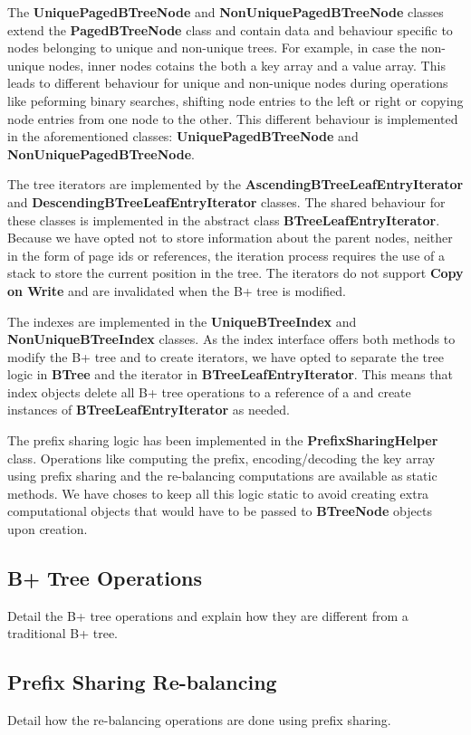\documentclass[11pt,a4paper,oneside]{article}
\begin{document}
The \textbf{UniquePagedBTreeNode} and \textbf{NonUniquePagedBTreeNode} classes extend the \textbf{PagedBTreeNode} class and contain data and behaviour specific to nodes belonging to unique and non-unique trees. For example, in case the non-unique nodes, inner nodes cotains the both a key array and a value array. This leads to different behaviour for unique and non-unique nodes during operations like peforming binary searches, shifting node entries to the left or right or copying node entries from one node to the other. This different behaviour is implemented in the aforementioned classes: \textbf{UniquePagedBTreeNode} and \textbf{NonUniquePagedBTreeNode}. 

The tree iterators are implemented by the \textbf{AscendingBTreeLeafEntryIterator} and \textbf{DescendingBTreeLeafEntryIterator} classes. The shared behaviour for these classes is implemented in the abstract class \textbf{BTreeLeafEntryIterator}. Because we have opted not to store information about the parent nodes, neither in the form of page ids or references, the iteration process requires the use of a stack to store the current position in the tree. The iterators do not support \textbf{Copy on Write} and are invalidated when the B+ tree is modified. 

The indexes are implemented in the \textbf{UniqueBTreeIndex} and \textbf{NonUniqueBTreeIndex} classes. As the index interface offers both methods to modify the B+ tree and to create iterators, we have opted to separate the tree logic in \textbf{BTree} and the iterator in \textbf{BTreeLeafEntryIterator}. This means that index objects delete all B+ tree operations to a reference of a  and create instances of \textbf{BTreeLeafEntryIterator} as needed.

The prefix sharing logic has been implemented in the \textbf{PrefixSharingHelper} class. Operations like computing the prefix, encoding/decoding the key array using prefix sharing and the re-balancing computations are available as static methods. We have choses to keep all this logic static to avoid creating extra computational objects that would have to be passed to \textbf{BTreeNode} objects upon creation.

\subsection{B+ Tree Operations} %
\label{sub:b_tree_operations}
Detail the B+ tree operations and explain how they are different from a traditional B+ tree.


\subsection{Prefix Sharing Re-balancing} %
\label{sub:prefix_sharing_rebalancing}
Detail how the re-balancing operations are done using prefix sharing.

\end{document}

